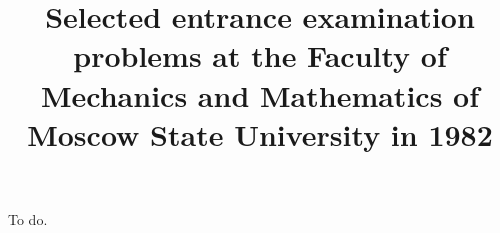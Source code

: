 \documentclass{article}
\title{Selected entrance examination problems at the Faculty of Mechanics and Mathematics of Moscow State University in 1982}
\author{}
\date{}
\begin{document}
\maketitle

\problem
To do.
\end{document}

